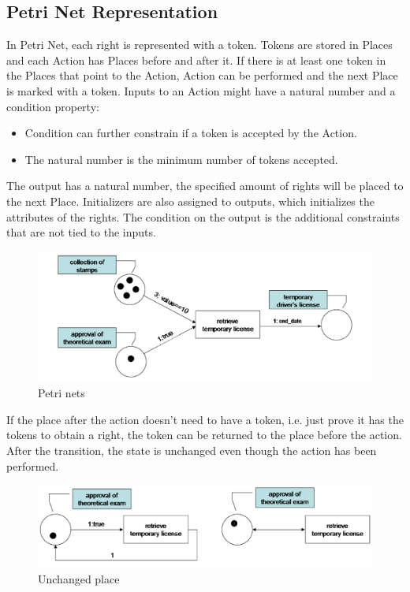 \documentclass[11pt]{article} %
\begin{document}
\subsection{Petri Net Representation}

In Petri Net, each right is represented with a token.
Tokens are stored in Places and each Action has Places before and after it.
If there is at least one token in the Places that point to the Action, Action can be performed and the next Place is marked with a token.
Inputs to an Action might have a natural number and a condition property:
\begin{itemize}
\item Condition can further constrain if a token is accepted by the Action.
\item The natural number is the minimum number of tokens accepted.
\end{itemize}
The output has a natural number, the specified amount of rights will be placed to the next Place.
Initializers are also assigned to outputs, which initializes the attributes of the rights.
The condition on the output is the additional constraints that are not tied to the inputs. 

\begin{figure}[h!]
\includegraphics[width=\textwidth]{petri}
\caption{Petri nets}
\end{figure}

If the place after the action doesn't need to have a token, i.e. just prove it has the tokens to obtain a right, the token can be returned to the place before the action.
After the transition, the state is unchanged even though the action has been performed.

\begin{figure}[h!]
\includegraphics[width=\textwidth]{petri2}
\caption{Unchanged place}
\end{figure}
\end{document}
